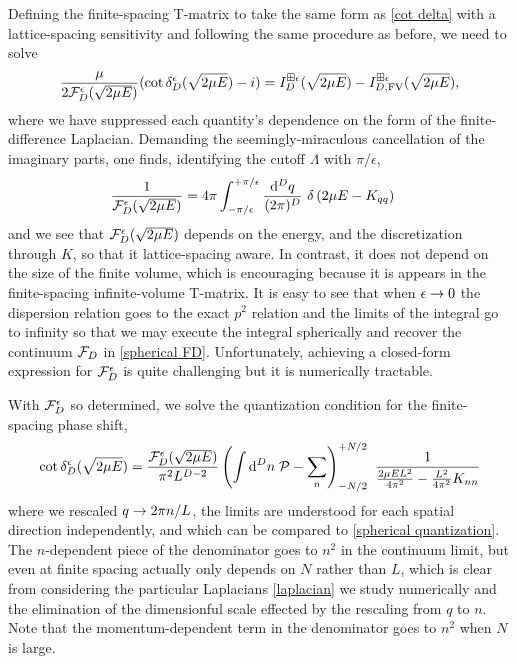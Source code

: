 Defining the finite-spacing T-matrix to take the same form as \eqref{cot delta} with a lattice-spacing sensitivity and following the same procedure as before, we need to solve
\begin{equation}
    \frac{\mu}{2\mathcal{F}_D^\epsilon(\sqrt{2 \mu E})}(\cot \delta_D^\epsilon(\sqrt{2 \mu E}) - i) = I_D^{\boxplus \epsilon}(\sqrt{2 \mu E}) - I_{D,\textrm{FV}}^{\boxplus \epsilon}(\sqrt{2 \mu E}),
\end{equation}
where we have suppressed each quantity's dependence on the form of the finite-difference Laplacian.
Demanding the seemingly-miraculous cancellation of the imaginary parts, one finds, identifying the cutoff $\Lambda$ with $\pi/\epsilon$,
\begin{align}
    \frac{1}{\mathcal{F}_D^\epsilon(\sqrt{2 \mu E})} &= 4\pi \int_{-\pi/\epsilon}^{+\pi/\epsilon} \frac{\mathrm{d}^D q}{(2\pi)^D}\
    \delta\left(2\mu E - K_{qq}\right)
\end{align}
and we see that $\mathcal{F}_D^\epsilon(\sqrt{2 \mu E})$ depends on the energy, and the discretization through $K$, so that it lattice-spacing aware.
In contrast, it does not depend on the size of the finite volume, which is encouraging because it is appears in the finite-spacing infinite-volume T-matrix.
It is easy to see that when $\epsilon\rightarrow0$ the dispersion relation goes to the exact $p^2$ relation and the limits of the integral go to infinity so that we may execute the integral spherically and recover the continuum $\mathcal{F}_D$ in \eqref{spherical FD}.
Unfortunately, achieving a closed-form expression for $\mathcal{F}_D^\epsilon$ is quite challenging but it is numerically tractable.

With $\mathcal{F}_D^\epsilon$ so determined, we solve the quantization condition for the finite-spacing phase shift,
\begin{align}
    \cot \delta_D^\epsilon(\sqrt{2 \mu E})
    =
    \frac{\mathcal{F}_D^\epsilon(\sqrt{2 \mu E})}{\pi^2 L^{D-2}}
    \left(\int \mathrm{d}^D n\; \mathcal{P} - \sum_n \right)_{-N/2}^{+N/2}\  \frac{1}{\frac{2\mu E L^2}{4\pi^2} - \frac{L^2}{4\pi^2} K_{nn}}
\end{align}
where we rescaled $q\rightarrow 2\pi n/L$, the limits are understood for each spatial direction independently, and which can be compared to \eqref{spherical quantization}.
The $n$-dependent piece of the denominator goes to $n^2$ in the continuum limit, but even at finite spacing actually only depends on $N$ rather than $L$, which is clear from considering the particular Laplacians \eqref{laplacian} we study numerically and the elimination of the dimensionful scale effected by the rescaling from $q$ to $n$.
Note that the momentum-dependent term in the denominator goes to $n^2$ when $N$ is large.

